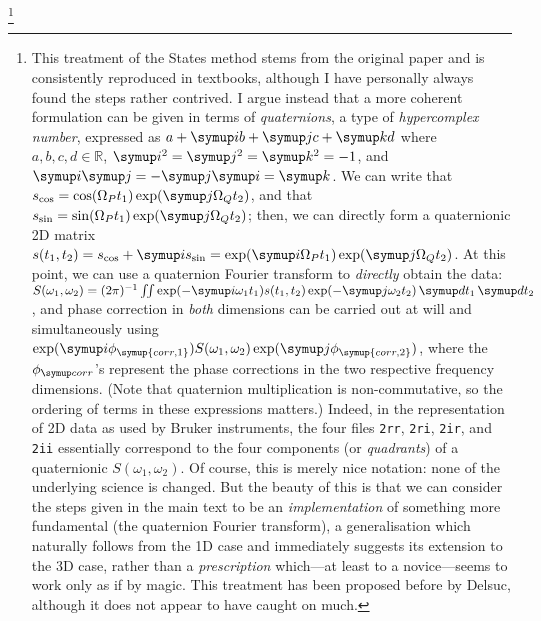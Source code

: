 \footnote{This treatment of the States method stems from the original paper\autocite{States1982JMR} and is consistently reproduced in textbooks, although I have personally always found the steps rather contrived.
I argue instead that a more coherent formulation can be given in terms of \textit{quaternions}, a type of \textit{hypercomplex number}, expressed as $a + \mi b + \mj c + \mk d$ where $a, b, c, d \in \mathbb{R}$, $\mi^2 = \mj^2 = \mk^2 = -1$, and $\mi\mj = -\mj\mi = \mk$.
    We can write that $s_\text{cos} = \cos(\Omega_P t_1)\exp(\mj\Omega_Q t_2)$, and that $s_\text{sin} = \sin(\Omega_P t_1)\exp(\mj\Omega_Q t_2)$; then, we can directly form a quaternionic 2D matrix $s(t_1, t_2) = s_\text{cos} + \mi s_\text{sin} = \exp(\mi\Omega_P t_1)\exp(\mj\Omega_Q t_2)$.
    At this point, we can use a quaternion Fourier transform to \textit{directly} obtain the data: $S(\omega_1, \omega_2) = (2\pi)^{-1}\iint \exp(-\mi\omega_1 t_1)s(t_1, t_2) \exp(-\mj\omega_2 t_2)\,\md t_1\,\md t_2$, and phase correction in \textit{both} dimensions can be carried out at will and simultaneously using
    $\exp(\mi \phi_{\symup{corr,1}})S(\omega_1, \omega_2) \exp(\mj\phi_{\symup{corr,2}})$, where the $\phicorr$'s represent the phase corrections in the two respective frequency dimensions.
    (Note that quaternion multiplication is non-commutative, so the ordering of terms in these expressions matters.)
    Indeed, in the representation of 2D data as used by Bruker instruments, the four files \texttt{2rr}, \texttt{2ri}, \texttt{2ir}, and \texttt{2ii} essentially correspond to the four components (or \textit{quadrants}) of a quaternionic $S(\omega_1, \omega_2)$.
    Of course, this is merely nice notation: none of the underlying science is changed.
    But the beauty of this is that we can consider the steps given in the main text to be an \textit{implementation} of something more fundamental (the quaternion Fourier transform), a generalisation which naturally follows from the 1D case and immediately suggests its extension to the 3D case, rather than a \textit{prescription} which---at least to a novice---seems to work only as if by magic.
    This treatment has been proposed before by Delsuc\autocite{Delsuc1988JMR}, although it does not appear to have caught on much.
}

